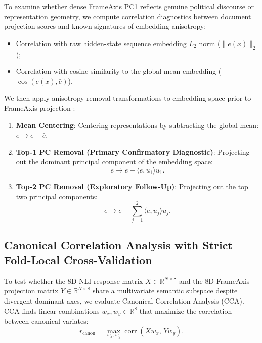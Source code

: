To examine whether dense FrameAxis PC1 reflects genuine political discourse or representation geometry, we compute correlation diagnostics between document projection scores and known signatures of embedding anisotropy:
\begin{itemize}
    \item Correlation with raw hidden-state sequence embedding $L_2$ norm ($\|e(x)\|_2$);
    \item Correlation with cosine similarity to the global mean embedding ($\cos(e(x), \bar{e})$).
\end{itemize}
We then apply anisotropy-removal transformations to embedding space prior to FrameAxis projection \citep{mu2018allbutthetop}:
\begin{enumerate}
    \item \textbf{Mean Centering}: Centering representations by subtracting the global mean: $e \to e - \bar{e}$.
    \item \textbf{Top-1 PC Removal (Primary Confirmatory Diagnostic)}: Projecting out the dominant principal component of the embedding space:
    \begin{equation}
        e \to e - \langle e, u_1 \rangle u_1.
    \end{equation}
    \item \textbf{Top-2 PC Removal (Exploratory Follow-Up)}: Projecting out the top two principal components:
    \begin{equation}
        e \to e - \sum_{j=1}^2 \langle e, u_j \rangle u_j.
    \end{equation}
\end{enumerate}

\subsection{Canonical Correlation Analysis with Strict Fold-Local Cross-Validation}
\label{sec:meth_cca}

To test whether the 8D NLI response matrix $X \in \mathbb{R}^{N \times 8}$ and the 8D FrameAxis projection matrix $Y \in \mathbb{R}^{N \times 8}$ share a multivariate semantic subspace despite divergent dominant axes, we evaluate Canonical Correlation Analysis (CCA). CCA finds linear combinations $w_x, w_y \in \mathbb{R}^8$ that maximize the correlation between canonical variates:
\begin{equation}
    r_{\mathrm{canon}} = \max_{w_x, w_y} \operatorname{corr}(X w_x,\, Y w_y).
\end{equation}

